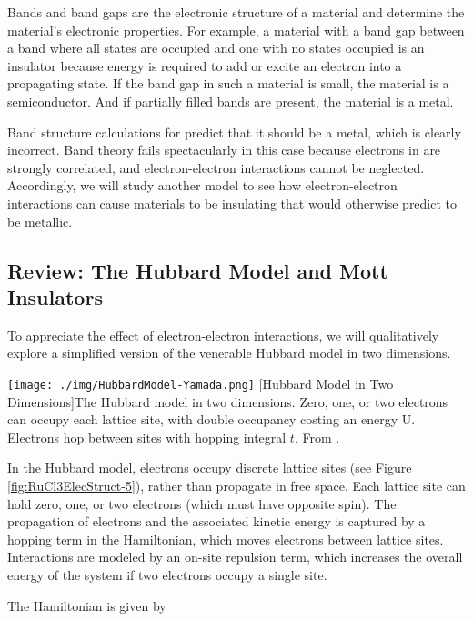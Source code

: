 Bands and band gaps are the electronic structure of a material and determine the material's electronic properties. For example, a material with a band gap between a band where all states are occupied and one with no states occupied is an insulator because energy is required to add or excite an electron into a propagating state. If the band gap in such a material is small, the material is a semiconductor. And if partially filled bands are present, the material is a metal.

Band structure calculations for \rucl predict that it should be a metal, which is clearly incorrect. Band theory fails spectacularly in this case because electrons in \rucl are strongly correlated, and electron-electron interactions cannot be neglected. Accordingly, we will study another model to see how electron-electron interactions can cause materials to be insulating that would otherwise predict to be metallic.

\subsection{Review: The Hubbard Model and Mott Insulators}

To appreciate the effect of electron-electron interactions, we will qualitatively explore a simplified version of the venerable Hubbard model in two dimensions.

\begin{centering}
\texttt{[image: ./img/HubbardModel-Yamada.png]}
  \captionsetup{width=0.5\textwidth}
  [Hubbard Model in Two Dimensions]{The Hubbard model in two dimensions. Zero, one, or two electrons can occupy each lattice site, with double occupancy costing an energy U. Electrons hop between sites with hopping integral $t$. From \cite{Yamada2018}.}
  \label{fig:RuCl3ElecStruct-5}
\end{centering}

In the Hubbard model, electrons occupy discrete lattice sites (see Figure \ref{fig:RuCl3ElecStruct-5}), rather than propagate in free space. Each lattice site can hold zero, one, or two electrons (which must have opposite spin). The propagation of electrons and the associated kinetic energy is captured by a hopping term in the Hamiltonian, which moves electrons between lattice sites. Interactions are modeled by an on-site repulsion term, which increases the overall energy of the system if two electrons occupy a single site.

The Hamiltonian is given by \cite{Atland2010}

